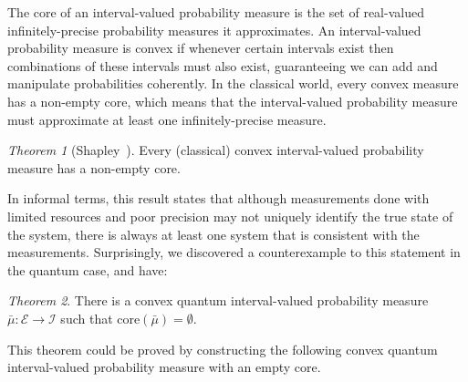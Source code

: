 \documentclass[12pt]{iopart}
\theoremstyle{remark}
\newtheorem{thm}{Theorem}
\newcommand{\events}{\ensuremath{\mathcal{E}}}
\begin{document}
\noindent The core of an interval-valued probability measure is the
set of real-valued infinitely-precise probability measures it
approximates. An interval-valued probability measure is convex if
whenever certain intervals exist then combinations of these intervals
must also exist, guaranteeing we can add and manipulate probabilities
coherently. In the classical world, every convex measure has a
non-empty core, which means that the interval-valued probability
measure must approximate at least one infinitely-precise measure.

\begin{thm}[Shapley~\cite{Shapley1971,,Grabisch2016}]\label{thm:Shapley}
  Every (classical) convex interval-valued probability measure has a
  non-empty core.
\end{thm}

In informal terms, this result states that although measurements done
with limited resources and poor precision may not uniquely identify
the true state of the system, there is always at least one system
that is consistent with the measurements. Surprisingly, we discovered
a counterexample to this statement in the quantum case, and have:

\begin{thm}\label{def:EmptyCoreQuantumInterval-valuedProbability}
There is a convex quantum interval-valued probability measure~$\bar{\mu}:\events\rightarrow\mathscr{I}$
such that $\mathrm{core}\left(\bar{\mu}\right)=\emptyset$.\end{thm}

This theorem could be proved by constructing the following convex
quantum interval-valued probability measure with an empty core.
\end{document}
